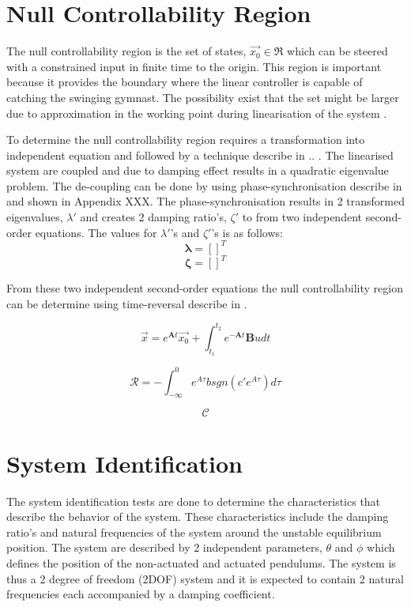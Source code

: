 \documentclass[a4paper,12pt]{article}
\begin{document}
	
	\section{Null Controllability Region}
	
	The null controllability region is the set of states, $\vec{x_{0}} \in \Re $ which can be steered with a constrained input in finite time to the origin. This region is important because it provides the boundary where the linear controller is capable of catching the swinging gymnast. The possibility exist that the set might be larger due to approximation in the working point during linearisation of the system \cite{simple_null_controllability}. 
	
	To determine the null controllability region requires a transformation into independent equation and followed by a technique describe in .. . The linearised system are coupled and due to damping effect results in a quadratic eigenvalue problem. The de-coupling can be done by using phase-synchronisation describe in \cite{independent_eqaution} and shown in Appendix XXX. The phase-synchronisation results in 2 transformed eigenvalues, $\lambda'$ and creates 2 damping ratio's, $\zeta'$ to from two independent second-order equations. The values for $\lambda'$'s and $\zeta'$'s is as follows: $$ \boldsymbol{\lambda} = [ ]^{T} $$ $$ \boldsymbol{\zeta} = []^{T} $$
	
	From these two independent second-order equations the null controllability region can be determine using time-reversal describe in \cite{null_controllability}.
	
	$$ \vec{x} = e^{\boldsymbol{A}t}\vec{x_{0}} + \int_{t_{1}}^{t_{2}} e^{-\boldsymbol{A}t}\boldsymbol{B}u dt $$ 
	
	$$\mathcal{R} = {-\int_{-\infty}^{0} e^{A\tau}bsgn(c'e^{A\tau})d\tau }  $$
	
	$$\mathcal{C} $$ 
	
	
	\section{System Identification}
	
	
	The system identification tests are done to determine the characteristics that describe the behavior of the system. These characteristics include the damping ratio's and natural frequencies of the system around the unstable equilibrium position. The system are described by 2 independent parameters, $\theta$ and $\phi$ which defines the position of the non-actuated and actuated pendulums. The system is thus a 2 degree of freedom (2DOF) system and it is expected to contain 2 natural frequencies each accompanied by a damping coefficient.
	
\end{document}
